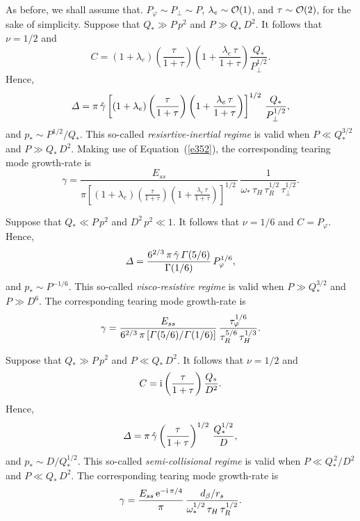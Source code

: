 \documentclass[notitlepage,12pt]{article}
\begin{document}
As before, we shall assume that. $P_\varphi\sim P_\perp \sim P$, $\lambda_e\sim{\cal O}(1)$, and $\tau\sim {\cal O}(2)$, for
the sake of simplicity. 
Suppose that $Q_\ast\gg P\,p^2$ and $P\gg Q_\ast\,D^2$. It follows that $\nu=1/2$ and
\begin{equation}
C = (1+\lambda_e)\left(\frac{\tau}{1+\tau}\right)\left(1+\frac{\lambda_e\,\tau}{1+\tau}\right)\frac{Q_\ast}{P_\perp^{1/2}}.
\end{equation}
Hence, 
\begin{equation}
{\mit\Delta} = \pi\,\hat{\gamma}\left[ (1+\lambda_e)\left(\frac{\tau}{1+\tau}\right)\left(1+\frac{\lambda_e\,\tau}{1+\tau}\right)\right]^{1/2}\,\frac{Q_\ast}{P_\perp^{1/2}},
\end{equation}
and $p_\ast\sim P^{1/2}/Q_\ast$. This so-called {\em resisrtive-inertial regime}\/ is valid when $P\ll Q_\ast^{3/2}$ and
$P\gg Q_\ast\,D^2$. 
Making use of Equation~(\ref{e352}), the corresponding tearing mode growth-rate is
\begin{equation}
\gamma = \frac{E_{ss}}{\pi\left[ (1+\lambda_e)\left(\frac{\tau}{1+\tau}\right)\left(1+\frac{\lambda_e\,\tau}{1+\tau}\right)\right]^{1/2}\,}\,\frac{1}{\omega_\ast\,\tau_H\,\tau_R^{1/2}\,\tau_\perp^{1/2}}.
\end{equation}

Suppose that $Q_\ast \ll P\,p^2$ and $D^2\,p^2\ll 1$. 
It follows that $\nu=1/6$ and
$C = P_\varphi$. 
Hence, 
\begin{equation}
{\mit\Delta} = \frac{6^{2/3}\,\pi\,\hat{\gamma}\, {\mit\Gamma}(5/6)}{\Gamma(1/6)}\,P_\varphi^{1/6}, 
\end{equation}
and $p_\ast\sim P^{-1/6}$. This so-called {\em visco-resistive regime}\/ is valid when $P\gg Q_\ast^{3/2}$ and
$P\gg D^6$. 
The corresponding tearing mode growth-rate is
\begin{equation}
\gamma = \frac{E_{ss}}{6^{2/3}\,\pi\,[{\mit\Gamma}(5/6)/{\mit\Gamma}(1/6)]}\,\frac{\tau_\varphi^{1/6}}{\tau_R^{5/6}\,\tau_H^{1/3}}.
\end{equation}

Suppose that $Q_\ast\gg P\,p^2$ and $P\ll Q_\ast\,D^2$. It follows that $\nu=1/2$ and
\begin{equation}
C = {\rm i}\left(\frac{\tau}{1+\tau}\right)\frac{Q_\ast}{D^2}.
\end{equation} 
Hence, 
\begin{equation}
{\mit\Delta} = \pi\,\hat{\gamma}\left(\frac{\tau}{1+\tau}\right)^{1/2}\,\frac{Q_\ast^{1/2}}{D},
\end{equation}
and $p_\ast\sim D/Q_\ast^{1/2}$. This so-called {\em semi-collisional regime}\/ is valid when $P\ll Q_\ast^{\,2}/D^2$ and
$P\ll Q_\ast\,D^2$. 
The corresponding tearing mode growth-rate is
\begin{equation}
\gamma = \frac{E_{ss}\,{\rm e}^{-{\rm i}\,\pi/4}}{\pi}\,\frac{d_\beta/r_s}{\omega_\ast^{1/2}\,\tau_H\,\tau_R^{1/2}}.
\end{equation}
\end{document}
